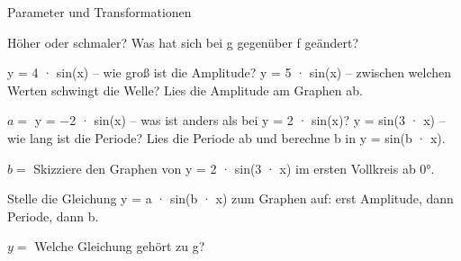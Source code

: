 \setcounter{aufgabe}{17}

\begin{aufgabe}{Parameter und Transformationen}
\begin{teile}
\teil Höher oder schmaler? Was hat sich bei g gegenüber f geändert?\\ 

\begin{ksys}[xmin=0,xmax=360,ymin=-2,ymax=2,xstep=45,ystep=0.5,ablesen]\end{ksys}
\teil y = 4 · sin(x) – wie groß ist die Amplitude? \leerfeld
\teil y = 5 · sin(x) – zwischen welchen Werten schwingt die Welle? \leerfeld
\teil Lies die Amplitude am Graphen ab.

\begin{ksys}[xmin=0,xmax=360,ymin=-3,ymax=3,xstep=45,ystep=0.5,ablesen]\end{ksys}
$a = $ \leerfeld
\teil y = −2 · sin(x) – was ist anders als bei y = 2 · sin(x)? \leerfeld
\teil y = sin(3 · x) – wie lang ist die Periode? \leerfeld[°]
\teil Lies die Periode ab und berechne b in y = sin(b · x).

\begin{ksys}[xmin=0,xmax=360,ymin=-2,ymax=2,xstep=45,ystep=0.5,ablesen]\end{ksys}
$b = $ \leerfeld
\teil Skizziere den Graphen von y = 2 · sin(3 · x) im ersten Vollkreis ab 0°.

\begin{ksys}[xmin=0,xmax=360,ymin=-3,ymax=3,xstep=30,ystep=1]\end{ksys}
\teil Stelle die Gleichung y = a · sin(b · x) zum Graphen auf: erst Amplitude, dann Periode, dann b.

\begin{ksys}[xmin=0,xmax=480,ymin=-5,ymax=5,xstep=60,ystep=1,ablesen]\end{ksys}
$y = $ \leerfeld
\teil Welche Gleichung gehört zu g?\\ \\ \\ 


\end{teile}
\end{aufgabe}
